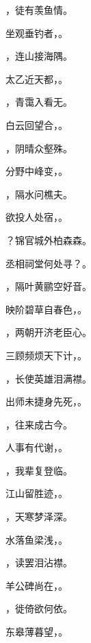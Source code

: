 \documentclass[12pt, a4paper, addpoints]{exam}
\begin{document}
\begin{questions}
\question[1] \uline{\qquad\qquad\qquad}，徒有羡鱼情。

\question[1] 坐观垂钓者，\uline{\qquad\qquad\qquad}。

\question[1] \uline{\qquad\qquad\qquad}，连山接海隅。

\question[1] 太乙近天都，\uline{\qquad\qquad\qquad}。

\question[1] \uline{\qquad\qquad\qquad}，青霭入看无。

\question[1] 白云回望合，\uline{\qquad\qquad\qquad}。

\question[1] \uline{\qquad\qquad\qquad}，阴晴众壑殊。

\question[1] 分野中峰变，\uline{\qquad\qquad\qquad}。

\question[1] \uline{\qquad\qquad\qquad}，隔水问樵夫。

\question[1] 欲投人处宿，\uline{\qquad\qquad\qquad}。

\question[1] \uline{\qquad\qquad\qquad}？锦官城外柏森森。

\question[1] 丞相祠堂何处寻？\uline{\qquad\qquad\qquad}。

\question[1] \uline{\qquad\qquad\qquad}，隔叶黄鹂空好音。

\question[1] 映阶碧草自春色，\uline{\qquad\qquad\qquad}。

\question[1] \uline{\qquad\qquad\qquad}，两朝开济老臣心。

\question[1] 三顾频烦天下计，\uline{\qquad\qquad\qquad}。

\question[1] \uline{\qquad\qquad\qquad}，长使英雄泪满襟。

\question[1] 出师未捷身先死，\uline{\qquad\qquad\qquad}。

\question[1] \uline{\qquad\qquad\qquad}，往来成古今。

\question[1] 人事有代谢，\uline{\qquad\qquad\qquad}。

\question[1] \uline{\qquad\qquad\qquad}，我辈复登临。

\question[1] 江山留胜迹，\uline{\qquad\qquad\qquad}。

\question[1] \uline{\qquad\qquad\qquad}，天寒梦泽深。

\question[1] 水落鱼梁浅，\uline{\qquad\qquad\qquad}。

\question[1] \uline{\qquad\qquad\qquad}，读罢泪沾襟。

\question[1] 羊公碑尚在，\uline{\qquad\qquad\qquad}。

\question[1] \uline{\qquad\qquad\qquad}，徙倚欲何依。

\question[1] 东皋薄暮望，\uline{\qquad\qquad\qquad}。


\end{questions}
\end{document}
